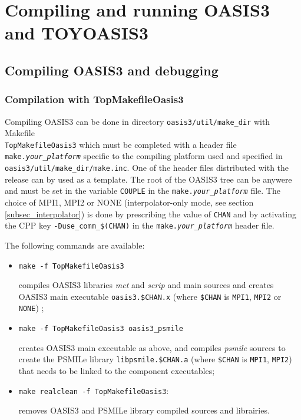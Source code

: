 \newpage
%

\chapter{Compiling and running OASIS3 and TOYOASIS3}
\label{sec_compilationrunning}

\section{Compiling OASIS3 and debugging}
\label{subsec_compile}



\subsection{Compilation with TopMakefileOasis3}
\label{sec_notSCE}

Compiling OASIS3 can be done in directory {\tt oasis3/util/make\_dir}
with Makefile \\ {\tt TopMakefileOasis3} which must be completed with a header file {\tt
  make.{\it your\_platform}} specific to the compiling platform used
and specified in {\tt oasis3/util/make\_dir/make.inc}.  One of the
header files distributed with the release can by used as a template.  The root of the OASIS3 tree
can be anywere and must be set in the variable {\tt COUPLE} in the
{\tt make.{\it your\_platform}} file. The choice of MPI1, MPI2 or NONE
(interpolator-only mode, see section \ref{subsec_interpolator}) is
done by prescribing the value of {\tt CHAN} and by activating the CPP key {\tt -Duse\_comm\_\$(CHAN)} in the {\tt make.{\it your\_platform}} header file.

The following commands are available:

\begin{itemize}
\item {\tt make -f TopMakefileOasis3} 

  compiles OASIS3 libraries {\it mct} and {\it scrip} and main sources and creates
  OASIS3 main executable {\tt oasis3.\$CHAN.x} (where {\tt \$CHAN} is
  {\tt MPI1}, {\tt MPI2} or {\tt NONE}) ;

\item {\tt make -f TopMakefileOasis3 oasis3\_psmile}

  creates OASIS3 main executable as above, and compiles {\it
    psmile} sources to create the PSMILe library {\tt libpsmile.\$CHAN.a} (where {\tt \$CHAN} is
  {\tt MPI1}, {\tt MPI2}) that needs to be linked to the component executables;

\item {\tt make realclean -f  TopMakefileOasis3}: 

  removes OASIS3 and PSMILe library compiled sources and librairies.

\end{itemize}

